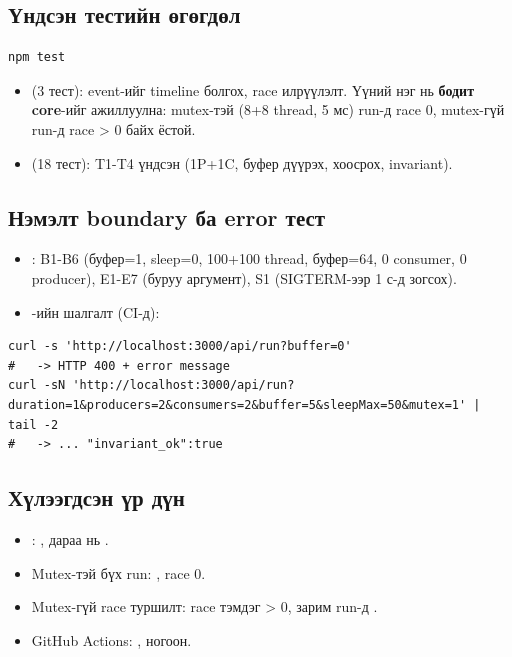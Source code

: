 \documentclass[12pt,a4paper]{article}
\begin{document}
\subsection{Үндсэн тестийн өгөгдөл}
\begin{lstlisting}[style=shell]
npm test
\end{lstlisting}
\begin{itemize}
  \item {} (3 тест): event-ийг timeline болгох, race илрүүлэлт. Үүний нэг нь \textbf{бодит core}-ийг ажиллуулна: mutex-тэй (8+8 thread, 5 мс) run-д race 0, mutex-гүй run-д race > 0 байх ёстой.
  \item {} (18 тест): T1-T4 үндсэн (1P+1C, буфер дүүрэх, хоосрох, invariant).
\end{itemize}

\subsection{Нэмэлт boundary ба error тест}
\begin{itemize}
  \item {}: B1-B6 (буфер=1, sleep=0, 100+100 thread, буфер=64, 0 consumer, 0 producer), E1-E7 (буруу аргумент), S1 (SIGTERM-ээр 1 с-д зогсох).
  \item {}-ийн шалгалт (CI-д):
\end{itemize}
\begin{lstlisting}[style=shell,breaklines=true]
curl -s 'http://localhost:3000/api/run?buffer=0'
#   -> HTTP 400 + error message
curl -sN 'http://localhost:3000/api/run?duration=1&producers=2&consumers=2&buffer=5&sleepMax=50&mutex=1' | tail -2
#   -> ... "invariant_ok":true
\end{lstlisting}

\subsection{Хүлээгдсэн үр дүн}
\begin{itemize}
  \item {}: , дараа нь .
  \item Mutex-тэй бүх run: , race 0.
  \item Mutex-гүй race туршилт: race тэмдэг > 0, зарим run-д .
  \item GitHub Actions: ,  ногоон.
\end{itemize}
\end{document}
